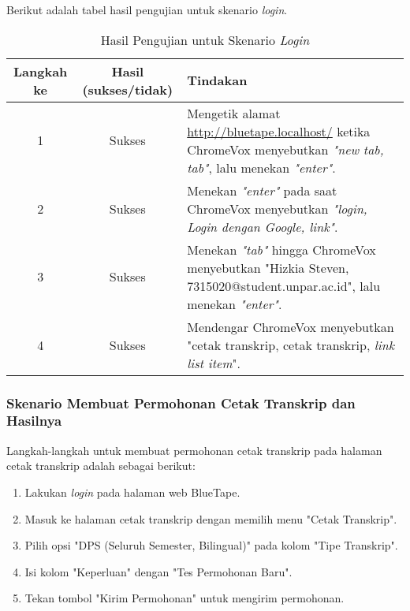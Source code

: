 Berikut adalah tabel hasil pengujian untuk skenario \textit{login}.

\begin{table}[H]
    \centering 
    \caption{Hasil Pengujian untuk Skenario \textit{Login}}
    \label{tab:hasil_pengujian_login}
    \begin{tabular}{|c|c|p{10cm}|}
        \toprule
        Langkah ke & Hasil (sukses/tidak) & Tindakan \\

        \midrule
        1 & Sukses & Mengetik alamat \url{http://bluetape.localhost/} ketika ChromeVox menyebutkan \textit{"new tab, tab"}, lalu menekan \textit{"enter"}. \\
        2 & Sukses & Menekan \textit{"enter"} pada saat ChromeVox menyebutkan \textit{"login, Login dengan Google, link"}. \\
        3 & Sukses & Menekan \textit{"tab"} hingga ChromeVox menyebutkan "Hizkia Steven, 7315020@student.unpar.ac.id", lalu menekan \textit{"enter"}. \\
        4 & Sukses & Mendengar ChromeVox menyebutkan "cetak transkrip, cetak transkrip, \textit{link list item}". \\

        \bottomrule

    \end{tabular}
\end{table}

\subsubsection{Skenario Membuat Permohonan Cetak Transkrip dan Hasilnya}
\label{subsubsec:skenario_membuat_permohonan_cetak_transkrip}
Langkah-langkah untuk membuat permohonan cetak transkrip pada halaman cetak transkrip adalah sebagai berikut:

\begin{enumerate}
    \item Lakukan \textit{login} pada halaman web BlueTape.
    \item Masuk ke halaman cetak transkrip dengan memilih menu "Cetak Transkrip".
    \item Pilih opsi "DPS (Seluruh Semester, Bilingual)" pada kolom "Tipe Transkrip".
    \item Isi kolom "Keperluan" dengan "Tes Permohonan Baru".
    \item Tekan tombol "Kirim Permohonan" untuk mengirim permohonan.
\end{enumerate}

